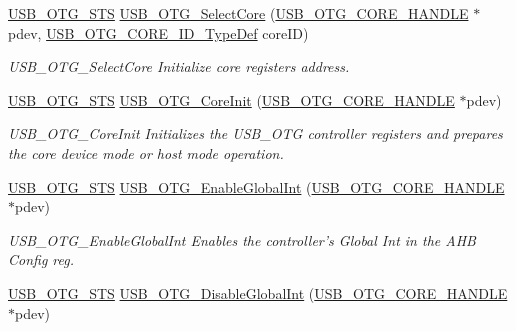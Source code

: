 \begin{DoxyCompactItemize}
\hyperlink{group___u_s_b___c_o_r_e___exported___types_ga8b6504b9af0662f17515795db0f9c8ed}{U\-S\-B\-\_\-\-O\-T\-G\-\_\-\-S\-T\-S} \hyperlink{group___u_s_b___c_o_r_e___private___functions_ga3478d2d5f39d97dac404a77d1589275e}{U\-S\-B\-\_\-\-O\-T\-G\-\_\-\-Select\-Core} (\hyperlink{group___u_s_b___c_o_r_e___exported___types_gaf76054c11eb8a3367907aad7ae700e80}{U\-S\-B\-\_\-\-O\-T\-G\-\_\-\-C\-O\-R\-E\-\_\-\-H\-A\-N\-D\-L\-E} $\ast$pdev, \hyperlink{group___u_s_b___d_e_f_i_n_e_s___exported___types_gab31b9dd0bc08bf6120424c20bda8eb7e}{U\-S\-B\-\_\-\-O\-T\-G\-\_\-\-C\-O\-R\-E\-\_\-\-I\-D\-\_\-\-Type\-Def} core\-I\-D)
\begin{DoxyCompactList}\small\item\em U\-S\-B\-\_\-\-O\-T\-G\-\_\-\-Select\-Core Initialize core registers address. \end{DoxyCompactList}\item 
\hyperlink{group___u_s_b___c_o_r_e___exported___types_ga8b6504b9af0662f17515795db0f9c8ed}{U\-S\-B\-\_\-\-O\-T\-G\-\_\-\-S\-T\-S} \hyperlink{group___u_s_b___c_o_r_e___private___functions_ga3438ecddea236fa11d27265d13d5fe84}{U\-S\-B\-\_\-\-O\-T\-G\-\_\-\-Core\-Init} (\hyperlink{group___u_s_b___c_o_r_e___exported___types_gaf76054c11eb8a3367907aad7ae700e80}{U\-S\-B\-\_\-\-O\-T\-G\-\_\-\-C\-O\-R\-E\-\_\-\-H\-A\-N\-D\-L\-E} $\ast$pdev)
\begin{DoxyCompactList}\small\item\em U\-S\-B\-\_\-\-O\-T\-G\-\_\-\-Core\-Init Initializes the U\-S\-B\-\_\-\-O\-T\-G controller registers and prepares the core device mode or host mode operation. \end{DoxyCompactList}\item 
\hyperlink{group___u_s_b___c_o_r_e___exported___types_ga8b6504b9af0662f17515795db0f9c8ed}{U\-S\-B\-\_\-\-O\-T\-G\-\_\-\-S\-T\-S} \hyperlink{group___u_s_b___c_o_r_e___private___functions_gafdfd916dd980623896bc39477ed1636e}{U\-S\-B\-\_\-\-O\-T\-G\-\_\-\-Enable\-Global\-Int} (\hyperlink{group___u_s_b___c_o_r_e___exported___types_gaf76054c11eb8a3367907aad7ae700e80}{U\-S\-B\-\_\-\-O\-T\-G\-\_\-\-C\-O\-R\-E\-\_\-\-H\-A\-N\-D\-L\-E} $\ast$pdev)
\begin{DoxyCompactList}\small\item\em U\-S\-B\-\_\-\-O\-T\-G\-\_\-\-Enable\-Global\-Int Enables the controller's Global Int in the A\-H\-B Config reg. \end{DoxyCompactList}\item 
\hyperlink{group___u_s_b___c_o_r_e___exported___types_ga8b6504b9af0662f17515795db0f9c8ed}{U\-S\-B\-\_\-\-O\-T\-G\-\_\-\-S\-T\-S} \hyperlink{group___u_s_b___c_o_r_e___private___functions_gaceb188e956d5f85d3e2ce0b8e735f613}{U\-S\-B\-\_\-\-O\-T\-G\-\_\-\-Disable\-Global\-Int} (\hyperlink{group___u_s_b___c_o_r_e___exported___types_gaf76054c11eb8a3367907aad7ae700e80}{U\-S\-B\-\_\-\-O\-T\-G\-\_\-\-C\-O\-R\-E\-\_\-\-H\-A\-N\-D\-L\-E} $\ast$pdev)

\end{DoxyCompactItemize}
